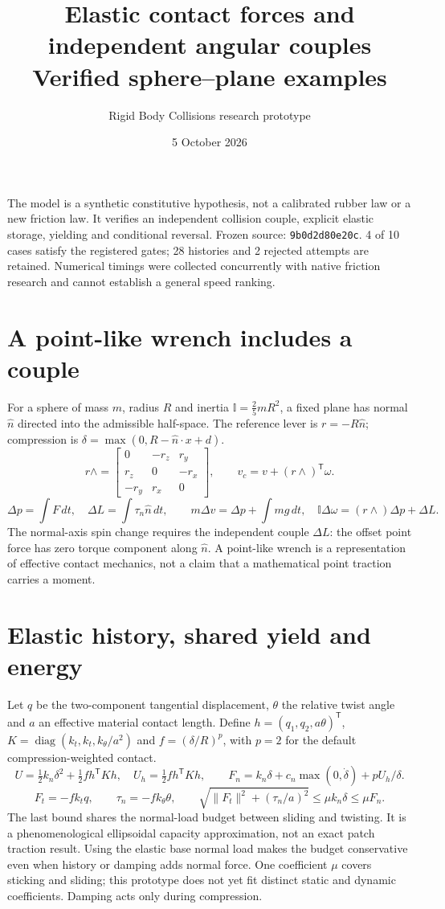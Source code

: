 \documentclass[10pt]{article}
\title{Elastic contact forces and independent angular couples\\Verified sphere--plane examples}
\author{Rigid Body Collisions research prototype}
\date{5 October 2026}
\begin{document}
\maketitle
The model is a synthetic constitutive hypothesis, not a calibrated rubber law or a new friction law. It verifies an independent collision couple, explicit elastic storage, yielding and conditional reversal. Frozen source: \texttt{9b0d2d80e20c}. 4 of 10 cases satisfy the registered gates; 28 histories and 2 rejected attempts are retained. Numerical timings were collected concurrently with native friction research and cannot establish a general speed ranking.
\section*{A point-like wrench includes a couple}
For a sphere of mass $m$, radius $R$ and inertia $\mathbb I=\frac25mR^2$, a fixed plane has normal $\hat n$ directed into the admissible half-space. The reference lever is $r=-R\hat n$; compression is $\delta=\max(0,R-\hat n\cdot x+d)$.
\[
r\wedge=\begin{bmatrix}0&-r_z&r_y\\r_z&0&-r_x\\-r_y&r_x&0\end{bmatrix},\qquad
v_c=v+(r\wedge)^\mathsf{T}\omega.
\]
\[
\Delta p=\int F\,dt,\quad \Delta L=\int \tau_n\hat n\,dt,\qquad
m\Delta v=\Delta p+\int mg\,dt,\quad
\mathbb I\Delta\omega=(r\wedge)\Delta p+\Delta L.
\]
The normal-axis spin change requires the independent couple $\Delta L$: the offset point force has zero torque component along $\hat n$. A point-like wrench is a representation of effective contact mechanics, not a claim that a mathematical point traction carries a moment.
\section*{Elastic history, shared yield and energy}
Let $q$ be the two-component tangential displacement, $\theta$ the relative twist angle and $a$ an effective material contact length. Define $h=(q_1,q_2,a\theta)^\mathsf{T}$, $K=\operatorname{diag}(k_t,k_t,k_\theta/a^2)$ and $f=(\delta/R)^p$, with $p=2$ for the default compression-weighted contact.
\[
U=\tfrac12k_n\delta^2+\tfrac12 f h^\mathsf TK h,\quad U_h=\tfrac12 f h^\mathsf TK h,\qquad
F_n=k_n\delta+c_n\max(0,\dot\delta)+pU_h/\delta.
\]
\[
F_t=-f k_t q,\qquad \tau_n=-f k_\theta\theta,\qquad
\sqrt{\lVert F_t\rVert^2+(\tau_n/a)^2}\leq\mu k_n\delta\leq\mu F_n.
\]
The last bound shares the normal-load budget between sliding and twisting. It is a phenomenological ellipsoidal capacity approximation, not an exact patch traction result. Using the elastic base normal load makes the budget conservative even when history or damping adds normal force. One coefficient $\mu$ covers sticking and sliding; this prototype does not yet fit distinct static and dynamic coefficients. Damping acts only during compression.
\end{document}

